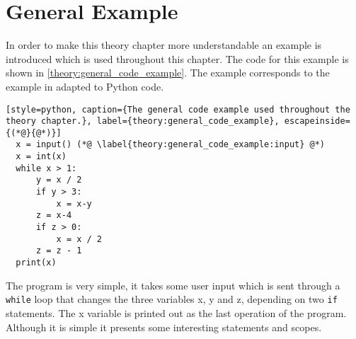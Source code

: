 \section{General Example}
In order to make this theory chapter more understandable an example is introduced which is used throughout this chapter.
The code for this example is shown in \cref{theory:general_code_example}.
The example corresponds to the example in \citet{schwartzbach} adapted to Python code.
\begin{lstlisting}[style=python, caption={The general code example used throughout the theory chapter.}, label={theory:general_code_example}, escapeinside={(*@}{@*)}]
  x = input() (*@ \label{theory:general_code_example:input} @*)
  x = int(x)
  while x > 1:
      y = x / 2
      if y > 3:
          x = x-y
      z = x-4
      if z > 0:
          x = x / 2
      z = z - 1
  print(x)
\end{lstlisting}

The program is very simple, it takes some user input which is sent through a \texttt{while} loop that changes the three variables x, y and z, depending on two \texttt{if} statements.
The x variable is printed out as the last operation of the program.
Although it is simple it presents some interesting statements and scopes.
